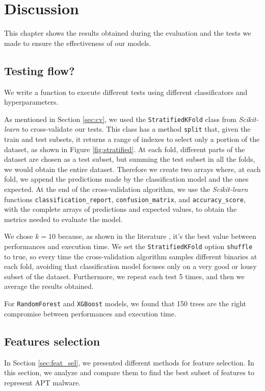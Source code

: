 \chapter{Discussion}
\label{ch:disc}

This chapter shows the results obtained during the evaluation and the tests we made to ensure the effectiveness of our models. 

\section{Testing flow?}

We write a function to execute different tests using different classificators and hyperparameters. 

As mentioned in Section \ref{sec:cv}, we used the \texttt{StratifiedKFold} class from \textit{Scikit-learn} to cross-validate our tests. This class has a method \texttt{split} that, given the train and test subsets, it returns a range of indexes to select only a portion of the dataset, as shown in Figure \ref{fig:stratified}.  At each fold, different parts of the dataset are chosen as a test subset, but summing the test subset in all the folds, we would obtain the entire dataset. Therefore we create two arrays where, at each fold, we append the predictions made by the classification model and the ones expected. At the end of the cross-validation algorithm, we use the \textit{Scikit-learn} functions \texttt{classification\_report}, \texttt{confusion\_matrix}, and \texttt{accuracy\_score}, with the complete arrays of predictions and expected values, to obtain the metrics needed to evaluate the model.

We chose $k = 10$ because, as shown in the literature \cite{kohavi1995study}, it's the best value between performances and execution time. 
We set the \texttt{StratifiedKFold} option \texttt{shuffle} to true, so every time the cross-validation algorithm samples different binaries at each fold, avoiding that classification model focuses only on a very good or lousy subset of the dataset. Furthermore, we repeat each test 5 times, and then we average the results obtained.

For \texttt{RandomForest} and \texttt{XGBoost} models, we found that 150 trees are the right compromise between performances and execution time.

\section{Features selection}
In Section \ref{sec:feat_sel}, we presented different methods for feature selection. In this section, we analyze and compare them to find the best subset of features to represent APT malware.

